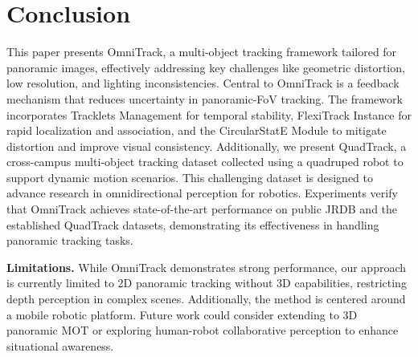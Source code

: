 \section{Conclusion}
\label{sec:Conclusion}
%
This paper presents OmniTrack, a multi-object tracking framework tailored for panoramic images, effectively addressing key challenges like geometric distortion, low resolution, and lighting inconsistencies. Central to OmniTrack is a feedback mechanism that reduces uncertainty in panoramic-FoV tracking. The framework incorporates Tracklets Management for temporal stability, FlexiTrack Instance for rapid localization and association, and the CircularStatE Module to mitigate distortion and improve visual consistency.
%
Additionally, we present QuadTrack, a cross-campus multi-object tracking dataset collected using a quadruped robot to support dynamic motion scenarios. 
This challenging dataset is designed to advance research in omnidirectional perception for robotics. Experiments verify that OmniTrack achieves state-of-the-art performance on public JRDB and the established QuadTrack datasets, demonstrating its effectiveness in handling panoramic tracking tasks.


\noindent\textbf{Limitations.} 
%
While OmniTrack demonstrates strong performance, our approach is currently limited to 2D panoramic tracking without 3D capabilities, restricting depth perception in complex scenes. Additionally, the method is centered around a mobile robotic platform. Future work could consider extending to 3D panoramic MOT or exploring human-robot collaborative perception to enhance situational awareness.

